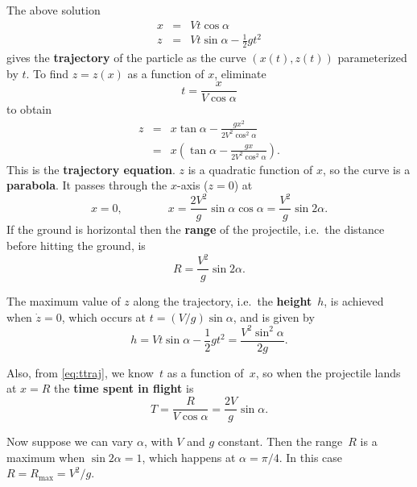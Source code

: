 

The above solution
\begin{eqnarray}
x & = & V t \cos \alpha   \nonumber \\
z & = & V t \sin \alpha - \frac{1}{2} g t^2  \nonumber
\end{eqnarray}
gives the {\bf trajectory} of the particle as the curve $(x(t),z(t))$ parameterized by $t$.
To find $z = z(x)$ as a function of $x$, eliminate
\begin{equation}
t = \frac{x}{V \cos \alpha}
\label{eq:ttraj}
\end{equation}
to obtain
\begin{eqnarray}
z & = & x \tan \alpha - \frac{g x^2}{2 V^2 \cos^2 \alpha}  \nonumber \\
  & = & x \left( \tan \alpha - \frac{g x}{2 V^2 \cos^2 \alpha} \right) . \nonumber
\end{eqnarray}
This is the {\bf trajectory equation}.
$z$ is a quadratic function of $x$, so the curve is a {\bf parabola}. It passes through
the $x$-axis ($z=0$) at
\begin{displaymath}
x = 0 , \qquad \qquad x = \frac{2V^2}{g} \sin \alpha \cos \alpha = \frac{V^2}{g} \sin 2 \alpha .
\end{displaymath}
If the ground is horizontal then the {\bf range} of the projectile, i.e.\ the distance
before hitting the ground, is
\begin{displaymath}
R = \frac{V^2}{g} \sin 2 \alpha .
\end{displaymath}

The maximum value of $z$ along the trajectory, i.e.\ the {\bf height}~$h$, is
achieved when $\dot{z} = 0$, which occurs at $t = (V/g) \sin \alpha$,
and is given by
\begin{displaymath}
h = V t \sin \alpha - \frac{1}{2} g t^2 = \frac{V^2 \sin^2 \alpha }{2 g} .
\end{displaymath}

Also, from \eqref{eq:ttraj}, we know~$t$ as a function of~$x$, so when the projectile
lands at $x = R$ the {\bf time spent in flight} is
\begin{displaymath}
T = \frac{R}{V \cos \alpha} = \frac{2 V}{g} \sin \alpha .
\end{displaymath}

\vspace{5mm}

Now suppose we can vary $\alpha$, with $V$ and $g$ constant. Then the range~$R$ is
a maximum when $\sin 2 \alpha = 1$, which happens at $\alpha = \pi / 4$. In this
case $R = R_\mathrm{max} = V^2 / g$.

